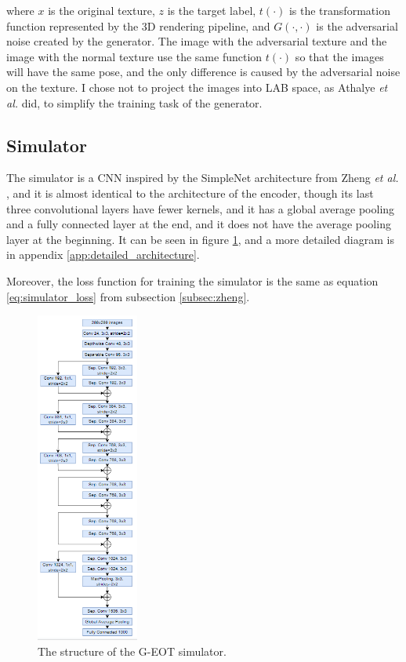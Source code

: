 \noindent where $x$ is the original texture, $z$ is the target label, $t(\cdot)$ is the transformation function represented by the 3D rendering pipeline, and $G(\cdot, \cdot)$ is the adversarial noise created by the generator. The image with the adversarial texture and the image with the normal texture use the same function $t(\cdot)$ so that the images will have the same pose, and the only difference is caused by the adversarial noise on the texture. I chose not to project the images into LAB space, as Athalye \textit{et al.} did, to simplify the training task of the generator.

\subsection{Simulator}

The simulator is a CNN inspired by the SimpleNet architecture from Zheng \textit{et al.} \cite{zheng_black_box_GAN}, and it is almost identical to the architecture of the encoder, though its last three convolutional layers have fewer kernels, and it has a global average pooling and a fully connected layer at the end, and it does not have the average pooling layer at the beginning. It can be seen in figure \ref{fig:proposed_simulator}, and a more detailed diagram is in appendix \ref{app:detailed_architecture}.

Moreover, the loss function for training the simulator is the same as equation \ref{eq:simulator_loss} from subsection \ref{subsec:zheng}.  

\begin{figure}[ht]
    \centering
    \includegraphics[width=0.3\textwidth]{graphics/g_eot_simulator.PNG}
    \caption{The structure of the G-EOT simulator.}
    \label{fig:proposed_simulator}
\end{figure}

